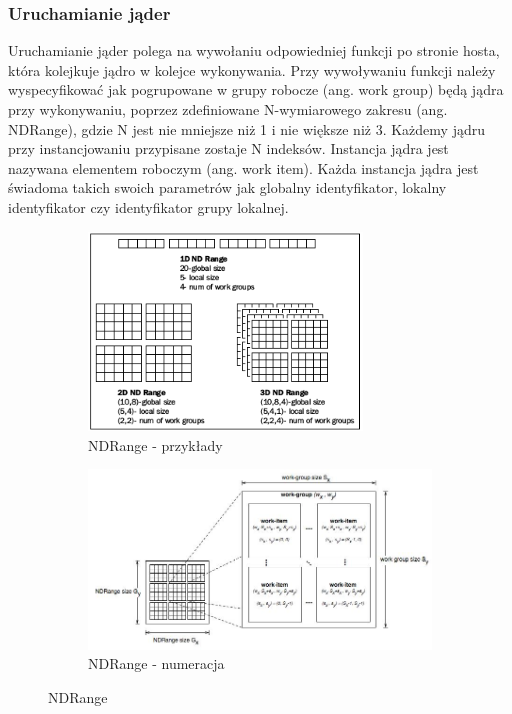 \documentclass[polish, 12pt]{aghthesis}
\begin{document}
	\subsubsection{Uruchamianie jąder}
	Uruchamianie jąder polega na wywołaniu odpowiedniej funkcji po stronie hosta, która kolejkuje jądro w kolejce wykonywania. Przy wywoływaniu funkcji należy wyspecyfikować jak pogrupowane w grupy robocze (ang. work group) będą jądra przy wykonywaniu, poprzez zdefiniowane N-wymiarowego zakresu (ang. NDRange), gdzie N jest nie mniejsze niż 1 i nie większe niż 3. Każdemy jądru przy instancjowaniu przypisane zostaje N indeksów. Instancja jądra jest nazywana elementem roboczym (ang. work item). Każda instancja jądra jest świadoma takich swoich parametrów jak globalny identyfikator, lokalny identyfikator czy identyfikator grupy lokalnej.
	
	
	\begin{figure}
	\centering
		\begin{subfigure}[b]{\textwidth}
			\centering
			\includegraphics[width=0.8\textwidth]{ndrange.png}
			\caption{NDRange - przykłady}
			\label{fig:ndrange_examples}
		\end{subfigure}
		\begin{subfigure}[b]{\textwidth}
			\centering
			\includegraphics[width=\textwidth]{ndrange2.jpg}
			\caption{NDRange - numeracja}
			\label{fig:ndrange_numbering}
		\end{subfigure}
		\caption{NDRange}
	\end{figure}
	
\end{document}
